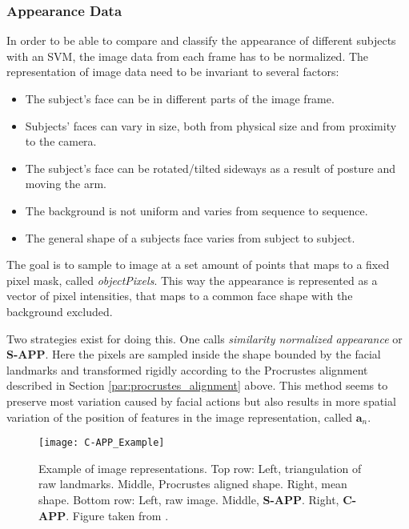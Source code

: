\documentclass[Main]{subfiles}
\begin{document}
		\subsubsection{Appearance Data} %
			\label{ssub:appearance_data}
			In order to be able to compare and classify the appearance of different subjects with an SVM, the image data from each frame has to be normalized.
			The representation of image data need to be invariant to several factors:
			\begin{itemize}
				\item
				The subject's face can be in different parts of the image frame.

				\item
				Subjects' faces can vary in size, both from physical size and from proximity to the camera.

				\item
				The subject's face can be rotated/tilted sideways as a result of posture and moving the arm.

				\item
				The background is not uniform and varies from sequence to sequence.

				\item
				The general shape of a subjects face varies from subject to subject.

			\end{itemize}

			The goal is to sample to image at a set amount of points that maps to a fixed pixel mask, called \emph{objectPixels}.
			This way the appearance is represented as a vector of pixel intensities, that maps to a common face shape with the background excluded.
			
			Two strategies exist for doing this.
			One \cite{Ashraf2009} calls  \emph{similarity normalized appearance} or \textbf{S-APP}.
			Here the pixels are sampled inside the shape bounded by the facial landmarks and transformed rigidly according to the Procrustes alignment described in Section \ref{par:procrustes_alignment} above.
			This method seems to preserve most variation caused by facial actions but also results in more spatial variation of the position of features in the image representation, called $\textbf{a}_n$.

			\vspace{5mm}
			\begin{figure}[H]
				\begin{center}
					\texttt{[image: C-APP\_Example]}
				\end{center}
				\caption{
					Example of image representations.
					Top row: Left, triangulation of raw landmarks. Middle, Procrustes aligned shape. Right, mean shape.
					Bottom row: Left, raw image. Middle, \textbf{S-APP}. Right, \textbf{C-APP}.
					Figure taken from \cite{Ashraf2009}.
					}
				\label{fig:app_strategies}
			\end{figure}
\end{document}
